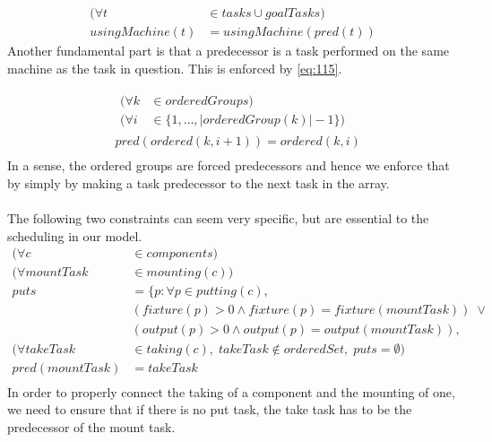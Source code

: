  \begin{equation}\label{eq:115}
 \begin{aligned}
 (\forall t &\in tasks \cup goalTasks) \\
 usingMachine(t) &= usingMachine(pred(t)) 
 \end{aligned}
 \end{equation}
Another fundamental part is that a predecessor is a task performed on the same machine as the task in question. This is enforced by \ref{eq:115}.

 \begin{equation}
 \begin{aligned}\label{eq:114}
 &\begin{aligned}
 (\forall k &\in orderedGroups) \\
 (\forall i &\in \{1 , \ldots , |orderedGroup(k)|-1\}) 
 \end{aligned}\\
 &pred(ordered(k, i + 1)) = ordered(k, i) \\
 \end{aligned}
 \end{equation}
In a sense, the ordered groups are forced predecessors and hence we enforce that by simply by making a task predecessor to the next task in the array.
\\\\
The following two constraints can seem very specific, but are essential to the scheduling in our model.
 \begin{equation}
 \begin{aligned}\label{eq:112}
 (\forall c &\in components) \\
 (\forall mountTask &\in mounting(c)) \\
 puts &= \{p : \forall p \in putting(c),\\
 &(fixture(p) > 0 \land fixture(p) = fixture(mountTask)) \; \lor  \\
 &(output(p) > 0 \land output(p) = output(mountTask)), \\
 (\forall takeTask &\in taking(c), \; takeTask \notin orderedSet, \; puts = \emptyset) \\
 pred(mountTask) &= takeTask \\
 \end{aligned}
 \end{equation}
 In order to properly connect the taking of a component and the mounting of one, we need to ensure that if there is no put task, the take task has to be the predecessor of the mount task. 
 
